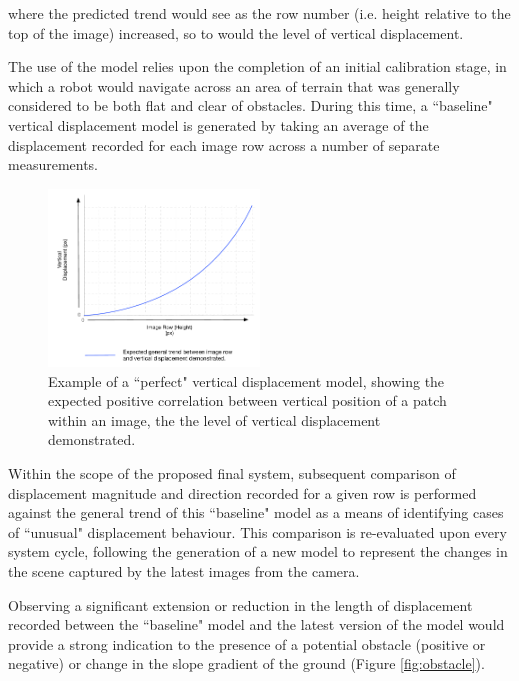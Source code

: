 	where the predicted trend would see as the row number (i.e. height relative to the top of the image) increased, so to would the level of vertical displacement.
	
The use of the model relies upon the completion of an initial calibration stage, in which a robot would navigate across an area of terrain that was generally considered to be both flat and clear of obstacles. During this time, a ``baseline" vertical displacement model is generated by taking an average of the displacement recorded for each image row across a number of separate measurements. 

\begin{figure}
\vspace{-30pt}
  \begin{center}
    \includegraphics[width=0.5\textwidth]{images/model.pdf}
  \end{center}
  \caption{Example of a ``perfect" vertical displacement model, showing the expected positive correlation between vertical position of a patch within an image, the the level of vertical displacement demonstrated.}
  \label{fig:model}
    \vspace{-30pt}
\end{figure}
	
Within the scope of the proposed final system, subsequent comparison of displacement magnitude and direction recorded for a given row is performed against the general trend of this ``baseline" model as a means of identifying cases of ``unusual" displacement behaviour. This comparison is re-evaluated upon every system cycle, following the generation of a new model to represent the changes in the scene captured by the latest images from the camera. 

Observing a significant extension or reduction in the length of displacement recorded between the ``baseline" model and the latest version of the model would provide a strong indication to the presence of a potential obstacle (positive or negative) or change in the slope gradient of the ground (Figure \ref{fig:obstacle}).

